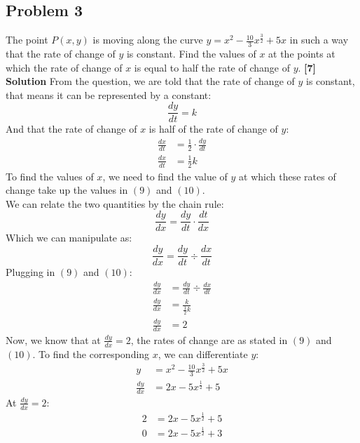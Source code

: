 \documentclass[hidelinks, a4paper, 12pt]{article}
\newcommand{\bd}{\textbf}
\newcommand{\n}{\\[\baselineskip]}
\newcommand{\dydx}{\frac{dy}{dx}}
\begin{document}
        \subsection{Problem 3}
            The point $P(x, y)$ is moving along the curve $y = x^2 - \frac{10}{3}x^{\frac{3}{2}}+5x$ in such a way that
            the rate of change of $y$ is constant. Find the values of $x$ at the points at which the rate of change of $x$ is equal to
            half the rate of change of $y$. \bd{[7]}\n
            \bd{Solution}
            From the question, we are told that the rate of change of $y$ is constant, that means it can be represented by a constant:
            \begin{equation}
                \frac{dy}{dt} = k 
            \end{equation}
            And that the rate of change of $x$ is half of the rate of change of $y$:
            \begin{equation}
                \begin{split}
                    \frac{dx}{dt} &= \frac{1}{2}\cdot \frac{dy}{dt}\\
                    \frac{dx}{dt} &= \frac{1}{2}k
                \end{split}
            \end{equation}
            To find the values of $x$, we need to find the value of $y$ at which these rates of change take up the values in $(9)$ and $(10)$.\n
            We can relate the two quantities by the chain rule:
            \[\dydx = \frac{dy}{dt} \cdot \frac{dt}{dx}\]
            Which we can manipulate as:
            \[\dydx = \frac{dy}{dt} \div \frac{dx}{dt}\]
            Plugging in $(9)$ and $(10)$:
            \[\begin{split}
                \dydx &= \frac{dy}{dt} \div \frac{dx}{dt}\\
                \dydx &= \frac{k}{\frac{1}{2}k}\\
                \dydx &= 2
            \end{split}\]
            Now, we know that at $\dydx = 2$, the rates of change are as stated in $(9)$ and $(10)$. To find the corresponding $x$, we can differentiate $y$:
            \[\begin{split}
                y &= x^2 - \frac{10}{3}x^{\frac{3}{2}}+5x\\
                \dydx &= 2x - 5x^{\frac{1}{2}} + 5
            \end{split}\]
            At $\dydx = 2$:
            \[\begin{split}
                2 &= 2x - 5x^{\frac{1}{2}} + 5\\
                0 &= 2x - 5x^{\frac{1}{2}} + 3
            \end{split}\]
\end{document}
